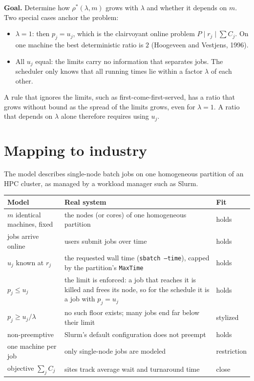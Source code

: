 \documentclass[11pt]{article}
\begin{document}
\noindent\textbf{Goal.} Determine how $\rho^{*}(\lambda,m)$ grows with $\lambda$ and whether it
depends on $m$. Two special cases anchor the problem:
\begin{itemize}
  \item $\lambda=1$: then $p_j=u_j$, which is the clairvoyant online problem
        $P\mid r_j\mid\sum C_j$. On one machine the best deterministic ratio is $2$
        (Hoogeveen and Vestjens, 1996).
  \item All $u_j$ equal: the limits carry no information that separates jobs. The scheduler only
        knows that all running times lie within a factor $\lambda$ of each other.
\end{itemize}
A rule that ignores the limits, such as first-come-first-served, has a ratio that grows without
bound as the spread of the limits grows, even for $\lambda=1$. A ratio that depends on $\lambda$
alone therefore requires using $u_j$.

\section{Mapping to industry}

The model describes single-node batch jobs on one homogeneous partition of an HPC cluster, as
managed by a workload manager such as Slurm.

\begin{center}
\small
\begin{tabularx}{\textwidth}{@{}l X l@{}}
\toprule
\textbf{Model} & \textbf{Real system} & \textbf{Fit}\\
\midrule
$m$ identical machines, fixed & the nodes (or cores) of one homogeneous partition & holds\\
jobs arrive online & users submit jobs over time & holds\\
$u_j$ known at $r_j$ & the requested wall time (\texttt{sbatch --time}), capped by the partition's \texttt{MaxTime} & holds\\
$p_j\le u_j$ & the limit is enforced: a job that reaches it is killed and frees its node, so for the schedule it is a job with $p_j=u_j$ & holds\\
$p_j\ge u_j/\lambda$ & no such floor exists; many jobs end far below their limit & stylized\\
non-preemptive & Slurm's default configuration does not preempt & holds\\
one machine per job & only single-node jobs are modeled & restriction\\
objective $\sum_j C_j$ & sites track average wait and turnaround time & close\\
\bottomrule
\end{tabularx}
\end{center}
\end{document}
